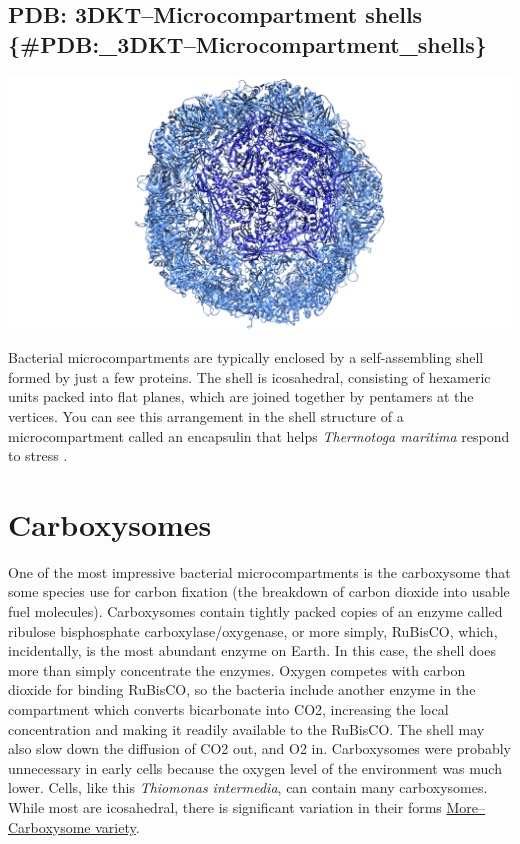 \documentclass[]{tufte-book}
\begin{document}
\subsection{PDB: 3DKT--Microcompartment shells
\{\#PDB:\_3DKT--Microcompartment\_shells\}}\label{pdb-3dktmicrocompartment-shells-pdb_3dktmicrocompartment_shells}

\includegraphics{img/schematics/4_6_1}

Bacterial microcompartments are typically enclosed by a self-assembling
shell formed by just a few proteins. The shell is icosahedral,
consisting of hexameric units packed into flat planes, which are joined
together by pentamers at the vertices. You can see this arrangement in
the shell structure of a microcompartment called an encapsulin that
helps \emph{Thermotoga maritima} respond to stress \citet{sutter2008}.

\section{Carboxysomes}\label{carboxysomes}

One of the most impressive bacterial microcompartments is the
carboxysome that some species use for carbon fixation (the breakdown of
carbon dioxide into usable fuel molecules). Carboxysomes contain tightly
packed copies of an enzyme called ribulose bisphosphate
carboxylase/oxygenase, or more simply, RuBisCO, which, incidentally, is
the most abundant enzyme on Earth. In this case, the shell does more
than simply concentrate the enzymes. Oxygen competes with carbon dioxide
for binding RuBisCO, so the bacteria include another enzyme in the
compartment which converts bicarbonate into CO2, increasing the local
concentration and making it readily available to the RuBisCO. The shell
may also slow down the diffusion of CO2 out, and O2 in. Carboxysomes
were probably unnecessary in early cells because the oxygen level of the
environment was much lower. Cells, like this \emph{Thiomonas
intermedia}, can contain many carboxysomes. While most are icosahedral,
there is significant variation in their forms
\protect\hyperlink{morelong-carboxysomes}{More--Carboxysome variety}.
\end{document}

